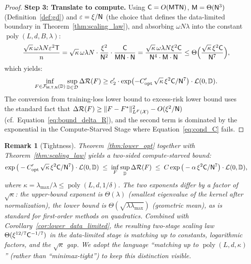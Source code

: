 \documentclass[11pt]{article}
\theoremstyle{plain}
\newtheorem{remark}[theorem]{Remark}
\DeclareMathOperator{\poly}{poly}
\begin{document}
\begin{proof}
    \textbf{Step 3: Translate to compute.} Using ${\sf C} = O({\sf MTN})$, ${\sf M}=\Theta({\sf N}^3)$ (Definition~\ref{def:gd}) and $\varepsilon = \xi/{\sf N}$ (the choice that defines the data-limited boundary in Theorem~\ref{thm:scaling_law}), and absorbing $\omega N\lambda$ into the constant $\poly(L,d,B,\lambda)$:
    \begin{align*}
        \frac{\sqrt{\kappa}\,\omega\lambda N\varepsilon^2 {\sf T}}{n} = \sqrt{\kappa}\,\omega\lambda N\cdot \frac{\xi^2}{{\sf N}^2}\cdot \frac{{\sf C}}{{\sf MN}\cdot \mathsf{N}} = \frac{\sqrt{\kappa}\,\omega\lambda N\xi^2 {\sf C}}{{\sf N}^4 \cdot {\sf M}\cdot \mathsf{N}} \le \Theta\Big(\frac{\sqrt{\kappa}\,\xi^2 {\sf C}}{{\sf N}^7}\Big),
    \end{align*}
    which yields:
    \begin{align*}
        \inf_{F\in {\cal F}_{\sf M, T, N}(\mathbb{D})}\sup_{\mathbb{D}\in{\cal D}}\Delta{\cal R}(F) \ge c_2'\cdot \exp\!\left(-C_{\rm opt}'\,\sqrt{\kappa}\,\xi^2{\sf C}/{\sf N}^7\right)\cdot {\cal L}(0,\mathbb{D}).
    \end{align*}
    The conversion from training-loss lower bound to excess-risk lower bound uses the standard fact that $\Delta {\cal R}(F)\ge \|F-F^*\|_{L^F({\cal X})}^2 - O(\xi^2/{\sf N})$ (cf.~Equation~\eqref{eq:bound_delta_R}), and the second term is dominated by the exponential in the Compute-Starved Stage where Equation~\eqref{eq:cond_C} fails.
\end{proof}

\begin{remark}[Tightness]\label{rem:tightness}
    Theorem~\ref{thm:lower_opt} together with Theorem~\ref{thm:scaling_law} yields a two-sided compute-starved bound:
    \begin{align*}
        \exp\big(-C_{\rm opt}'\,\sqrt{\kappa}\,\xi^2{\sf C}/{\sf N}^7\big)\cdot {\cal L}(0,\mathbb{D}) \;\le\; \inf_{F}\sup_\mathbb{D}\Delta{\cal R}(F) \;\le\; C\exp\big(-\alpha\,\xi^2{\sf C}/{\sf N}^7\big)\cdot {\cal L}(0,\mathbb{D}),
    \end{align*}
    where $\kappa=\lambda_{\max}/\lambda\le\poly(L,d,1/\delta)$. The two exponents differ by a factor of $\sqrt{\kappa}$: the upper-bound exponent is $\Theta(\lambda)$ (smallest eigenvalue of the kernel after normalization), the lower bound is $\Theta(\sqrt{\lambda\lambda_{\max}})$ (geometric mean), as is standard for first-order methods on quadratics. Combined with Corollary~\ref{cor:lower_data_limited}, the resulting two-stage scaling law $\Theta(\xi^{12/7}{\sf C}^{-1/7})$ in the data-limited stage is matching up to constants, logarithmic factors, and the $\sqrt{\kappa}$ gap. We adopt the language ``matching up to $\poly(L,d,\kappa)$'' (rather than ``minimax-tight'') to keep this distinction visible.
\end{remark}
\end{document}
